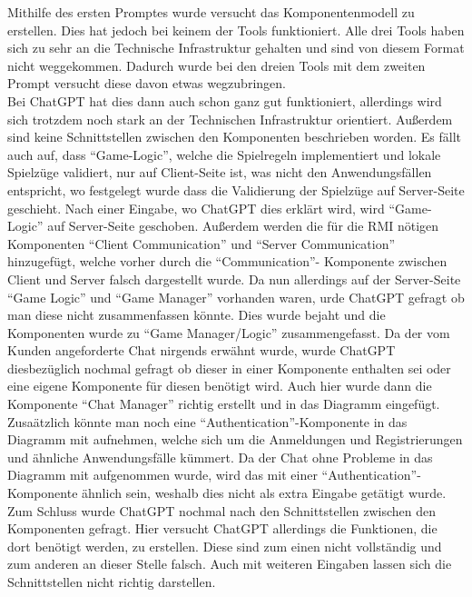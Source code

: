 Mithilfe des ersten Promptes wurde versucht das Komponentenmodell zu erstellen. Dies hat jedoch bei keinem der Tools funktioniert.
Alle drei Tools haben sich zu sehr an die Technische Infrastruktur gehalten und sind von diesem Format nicht weggekommen. Dadurch wurde bei den dreien Tools
mit dem zweiten Prompt versucht diese davon etwas wegzubringen.\\

Bei ChatGPT hat dies dann auch schon ganz gut funktioniert, allerdings wird sich trotzdem noch stark an der Technischen Infrastruktur orientiert.
Außerdem sind keine Schnittstellen zwischen den Komponenten beschrieben worden. Es fällt auch auf, dass ``Game-Logic'', welche die Spielregeln implementiert
und lokale Spielzüge validiert, nur auf Client-Seite ist, was nicht den Anwendungsfällen entspricht, wo festgelegt wurde dass die Validierung der 
Spielzüge auf Server-Seite geschieht. Nach einer Eingabe, wo ChatGPT dies erklärt wird, wird ``Game-Logic'' auf Server-Seite geschoben. Außerdem werden 
die für die RMI nötigen Komponenten ``Client Communication'' und ``Server Communication'' hinzugefügt, welche vorher durch die ``Communication''- Komponente 
zwischen Client und Server falsch dargestellt wurde. Da nun allerdings auf der Server-Seite ``Game Logic'' und ``Game Manager'' vorhanden waren, 
urde ChatGPT gefragt ob man diese nicht zusammenfassen könnte. Dies wurde bejaht und die Komponenten wurde zu ``Game Manager/Logic'' 
zusammengefasst. Da der vom Kunden angeforderte Chat nirgends erwähnt wurde, wurde ChatGPT diesbezüglich nochmal gefragt ob dieser in einer Komponente 
enthalten sei oder eine eigene Komponente für diesen benötigt wird. Auch hier wurde dann die Komponente ``Chat Manager'' richtig erstellt und in das Diagramm 
eingefügt. Zusaätzlich könnte man noch eine ``Authentication''-Komponente in das Diagramm mit aufnehmen, welche sich um die Anmeldungen und 
Registrierungen und ähnliche Anwendungsfälle kümmert. Da der Chat ohne Probleme in das Diagramm mit aufgenommen wurde, wird das mit einer 
``Authentication''-Komponente ähnlich sein, weshalb dies nicht als extra Eingabe getätigt wurde. Zum Schluss wurde ChatGPT nochmal nach den Schnittstellen 
zwischen den Komponenten gefragt. Hier versucht ChatGPT allerdings die Funktionen, die dort benötigt werden, zu erstellen. Diese sind zum einen nicht 
vollständig und zum anderen an dieser Stelle falsch. Auch mit weiteren Eingaben lassen sich die Schnittstellen nicht richtig darstellen.\\

